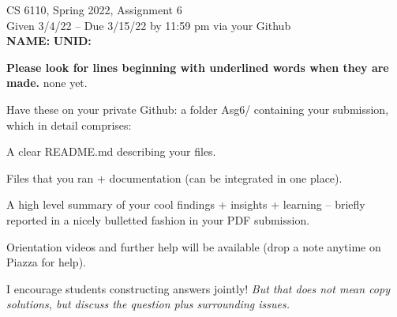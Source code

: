 \documentclass[11pt]{article}
\begin{document}

\newlength{\minpagw}
\settowidth{\minpagw}{\hspace{40em}}

\begin{center}
\begin{large}
  CS 6110, Spring 2022, Assignment 6  \\
  Given 3/4/22 -- Due 3/15/22 by 11:59 pm via your Github 
  \ \\
    {  {\Large\bf NAME: } \hfill {\Large\bf UNID: }\hspace{4cm} }
          \ \\
\end{large}

\end{center}

 {\bf Please look for lines beginning with underlined words when they are made.}
         {\tiny none yet.}

         Have these on your private Github:
         a folder Asg6/ containing your submission, which in detail comprises:
         \begin{compactitem}
         \item A clear README.md describing your files.
         \item Files that you ran + documentation (can be integrated in one place).
         \item A high level summary of your cool findings + insights + learning -- briefly reported in
           a nicely bulletted fashion in your PDF submission.
         \end{compactitem}

Orientation videos and further help will be available (drop a note anytime
on Piazza for help).

I encourage students constructing answers jointly! {\em But that does not
mean copy solutions, but discuss the question plus surrounding issues.}
\end{document}
